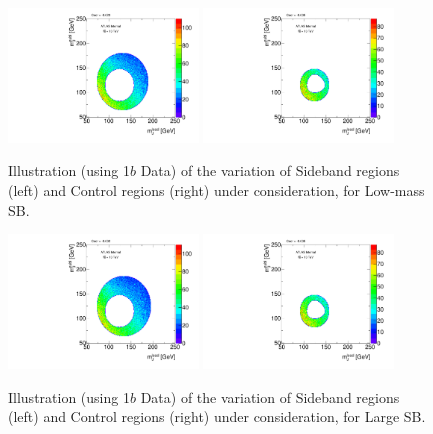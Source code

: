 \begin{figure}[htbp!]
\begin{center}
\includegraphics[width=0.45\textwidth,angle=-90]{figures/boosted/Syst_CRSB/SB_Low_Sideband_OneTag_mH0H1.pdf}
\includegraphics[width=0.45\textwidth,angle=-90]{figures/boosted/Syst_CRSB/SB_Low_Control_OneTag_mH0H1.pdf}\\
\end{center}
\caption{Illustration (using 1$b$ Data) of the variation of Sideband regions (left) and Control regions (right) under consideration, for Low-mass SB.}
\label{CRSB:SB_Low}
\end{figure}

\begin{figure}[htbp!]
\begin{center}
\includegraphics[width=0.45\textwidth,angle=-90]{figures/boosted/Syst_CRSB/SB_Large_Sideband_OneTag_mH0H1.pdf}
\includegraphics[width=0.45\textwidth,angle=-90]{figures/boosted/Syst_CRSB/SB_Large_Control_OneTag_mH0H1.pdf}\\
\end{center}
\caption{Illustration (using 1$b$ Data) of the variation of Sideband regions (left) and Control regions (right) under consideration, for Large SB.}
\label{CRSB:SB_Large}
\end{figure}

